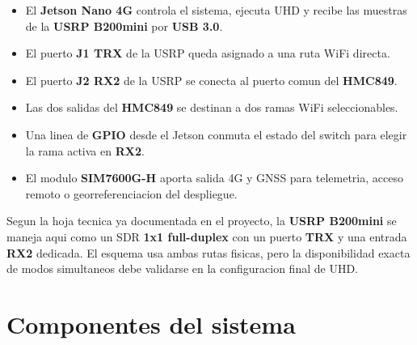 \documentclass[11pt]{article}
\begin{document}
\begin{itemize}[leftmargin=*]
    \item El \textbf{Jetson Nano 4G} controla el sistema, ejecuta UHD y recibe las muestras de la \textbf{USRP B200mini} por \textbf{USB 3.0}.
    \item El puerto \textbf{J1 TRX} de la USRP queda asignado a una ruta WiFi directa.
    \item El puerto \textbf{J2 RX2} de la USRP se conecta al puerto comun del \textbf{HMC849}.
    \item Las dos salidas del \textbf{HMC849} se destinan a dos ramas WiFi seleccionables.
    \item Una linea de \textbf{GPIO} desde el Jetson conmuta el estado del switch para elegir la rama activa en \textbf{RX2}.
    \item El modulo \textbf{SIM7600G-H} aporta salida 4G y GNSS para telemetria, acceso remoto o georreferenciacion del despliegue.
\end{itemize}

\begin{nota}
Segun la hoja tecnica ya documentada en el proyecto, la \textbf{USRP B200mini} se maneja aqui como un SDR \textbf{1x1 full-duplex} con un puerto \textbf{TRX} y una entrada \textbf{RX2} dedicada. El esquema usa ambas rutas fisicas, pero la disponibilidad exacta de modos simultaneos debe validarse en la configuracion final de UHD.
\end{nota}

\section{Componentes del sistema}
\end{document}
